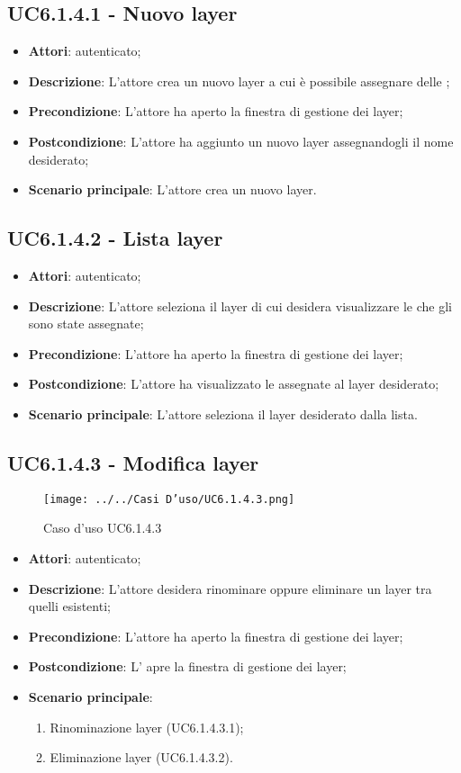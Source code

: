 \subsection{UC6.1.4.1 - Nuovo layer}
\label{ssec:UC6.1.4.1}
\begin{itemize}
\item \textbf{Attori}:  autenticato;
\item \textbf{Descrizione}: L'attore crea un nuovo layer a cui è possibile assegnare delle ;
\item \textbf{Precondizione}: L'attore ha aperto la finestra di gestione dei layer;
\item \textbf{Postcondizione}: L'attore ha aggiunto un nuovo layer assegnandogli il nome desiderato;
\item \textbf{Scenario principale}: L'attore crea un nuovo layer.
\end{itemize}
\subsection{UC6.1.4.2 - Lista layer}
\label{ssec:UC6.1.4.2}
\begin{itemize}
\item \textbf{Attori}:  autenticato;
\item \textbf{Descrizione}: L'attore seleziona il layer di cui desidera visualizzare le  che gli sono state assegnate;
\item \textbf{Precondizione}: L'attore ha aperto la finestra di gestione dei layer;
\item \textbf{Postcondizione}: L'attore ha visualizzato le  assegnate al layer desiderato;
\item \textbf{Scenario principale}: L'attore seleziona il layer desiderato dalla lista.
\end{itemize}
\newpage
\subsection{UC6.1.4.3 - Modifica layer}
\label{ssec:UC6.1.4.3}
\begin{figure}[h!]
\centering
\texttt{[image: ../../Casi D'uso/UC6.1.4.3.png]}
\caption{Caso d'uso UC6.1.4.3}
 \end{figure}
\begin{itemize}
\item \textbf{Attori}:  autenticato;
\item \textbf{Descrizione}: L'attore desidera rinominare oppure eliminare un layer tra quelli esistenti;
\item \textbf{Precondizione}: L'attore ha aperto la finestra di gestione dei layer;
\item \textbf{Postcondizione}: L' apre la finestra di gestione dei layer;
\item \textbf{Scenario principale}: \begin{enumerate}\item Rinominazione layer (UC6.1.4.3.1);\item Eliminazione layer (UC6.1.4.3.2).
 \end{enumerate}
\end{itemize}
